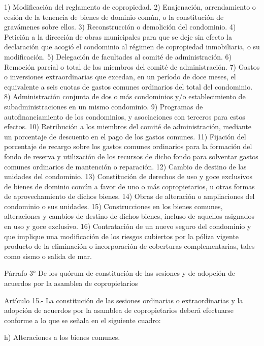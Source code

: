     1) Modificación del reglamento de copropiedad.
    2) Enajenación, arrendamiento o cesión de la tenencia de bienes de dominio común, o la constitución de gravámenes sobre ellos.
    3) Reconstrucción o demolición del condominio.
    4) Petición a la dirección de obras municipales para que se deje sin efecto la declaración que acogió el condominio al régimen de copropiedad inmobiliaria, o su modificación.
    5) Delegación de facultades al comité de administración.
    6) Remoción parcial o total de los miembros del comité de administración.
    7) Gastos o inversiones extraordinarias que excedan, en un período de doce meses, el equivalente a seis cuotas de gastos comunes ordinarios del total del condominio.
    8) Administración conjunta de dos o más condominios y/o establecimiento de subadministraciones en un mismo condominio.
    9) Programas de autofinanciamiento de los condominios, y asociaciones con terceros para estos efectos.
    10) Retribución a los miembros del comité de administración, mediante un porcentaje de descuento en el pago de los gastos comunes.
    11) Fijación del porcentaje de recargo sobre los gastos comunes ordinarios para la formación del fondo de reserva y utilización de los recursos de dicho fondo para solventar gastos comunes ordinarios de mantención o reparación.
    12) Cambio de destino de las unidades del condominio.
    13) Constitución de derechos de uso y goce exclusivos de bienes de dominio común a favor de uno o más copropietarios, u otras formas de aprovechamiento de dichos bienes.
    14) Obras de alteración o ampliaciones del condominio o sus unidades.
    15) Construcciones en los bienes comunes, alteraciones y cambios de destino de dichos bienes, incluso de aquellos asignados en uso y goce exclusivo.
    16) Contratación de un nuevo seguro del condominio y que implique una modificación de los riesgos cubiertos por la póliza vigente producto de la eliminación o incorporación de coberturas complementarias, tales como sismo o salida de mar.
     
    Párrafo 3°
    De los quórum de constitución de las sesiones y de adopción de acuerdos por la asamblea de copropietarios

     
    Artículo 15.- La constitución de las sesiones ordinarias o extraordinarias y la adopción de acuerdos por la asamblea de copropietarios deberá efectuarse conforme a lo que se señala en el siguiente cuadro:
     
    
    
    
              h) Alteraciones
              a los bienes
              comunes.


